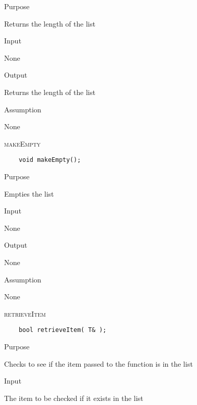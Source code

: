 \documentclass[pdftex, 11pt]{article}
\begin{document}
\begin{description}
		\begin{description}

			\item{Purpose}

				Returns the length of the list

			\item{Input}

				None

			\item{Output}

				Returns the length of the list

			\item{Assumption}

				None

		\end{description}

	\item{\textsc{makeEmpty}}
\begin{lstlisting}
	void makeEmpty();
\end{lstlisting}

		\begin{description}

			\item{Purpose}

				Empties the list

			\item{Input}

				None

			\item{Output}

				None
			\item{Assumption}

				None

		\end{description}

	\item{\textsc{retrieveItem}}
\begin{lstlisting}
	bool retrieveItem( T& );
\end{lstlisting}

		\begin{description}

			\item{Purpose}

				Checks to see if the item passed to the function is in the list

			\item{Input}

				The item to be checked if it exists in the list


\end{description}
\end{description}
\end{document}
